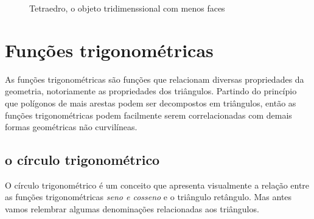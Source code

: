 \begin{multicols*}{2}
    \begin{figure}[H]
        \centering
        \caption{Tetraedro, o objeto tridimenssional com menos faces}
    \end{figure}

    \vfill\null
    \pagebreak
    \vfill\null

    \section*{Funções trigonométricas}
    As funções trigonométricas são funções que relacionam diversas propriedades
    da geometria, notoriamente as propriedades dos triângulos. Partindo do
    princípio que polígonos de mais arestas podem ser decompostos em triângulos,
    então as funções trigonométricas podem facilmente serem correlacionadas com
    demais formas geométricas não curvilíneas.

    \subsection*{o círculo trigonométrico}
    O círculo trigonométrico é um conceito que apresenta visualmente a relação
    entre as funções trigonométricas \textit{seno e cosseno} e o triângulo retângulo.
    Mas antes vamos relembrar algumas denominações relacionadas aos triângulos.


\end{multicols*}
